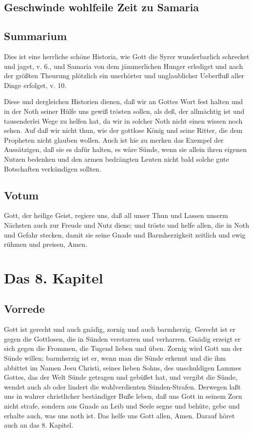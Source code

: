 \section{Geschwinde wohlfeile Zeit zu Samaria}

\section{Summarium}

Dies ist eine herrliche schöne Historia, wie Gott die Syrer wunderbarlich schrecket und jaget, v. 6., und Samaria von dem jämmerlichen Hunger erlediget und nach der größten Theurung plötzlich ein unerhörter und unglaublicher Ueberfluß aller Dinge erfolget, v. 10.

Diese und dergleichen Historien dienen, daß wir an Gottes Wort fest halten und in der Noth seiner Hülfe uns gewiß trösten sollen, als deß,
der allmächtig ist und tausenderlei Wege zu helfen hat, da wir in solcher Noth nicht einen wissen noch sehen. Auf daß wir nicht thun, wie der gottlose König und seine Ritter, die dem Propheten nicht glauben wollen. Auch ist hie zu merken das Exempel der Aussätzigen, daß sie es dafür halten, es wäre Sünde, wenn sie allein ihren eigenen Nutzen bedenken und den armen bedrängten Leuten nicht bald solche gute Botschaften verkündigen sollten.

\section{Votum}

Gott, der heilige Geist, regiere uns, daß all unser Thun und Lassen unserm Nächsten auch zur Freude und Nutz diene; und tröste und helfe allen, die in Noth und Gefahr stecken, damit sie seine Gnade und Barmherzigkeit zeitlich und ewig rühmen und preisen, Amen.

\chapter{Das 8. Kapitel}

\section{Vorrede}

Gott ist gerecht und auch gnädig, zornig und auch barmherzig. Gerecht ist er gegen die Gottlosen, die in Sünden verstarren und verharren. Gnädig erzeigt er sich gegen die Frommen, die Tugend lieben und üben. Zornig wird Gott um der Sünde willen; barmherzig ist er, wenn man die Sünde erkennt und die ihm abbittet im Namen Jesu Christi, seines lieben Sohns, des unschuldigen Lammes Gottes, das der Welt Sünde getragen und gebüßet hat, und vergibt die Sünde, wendet auch ab oder lindert die wohlverdienten Sünden-Strafen. Derwegen laßt uns in wahrer christlicher beständiger Buße leben, daß uns Gott in seinem Zorn nicht strafe, sondern aus Gnade an Leib und Seele segne und behüte, gebe und erhalte auch, was uns noth ist. Das helfe uns Gott allen, Amen. Darauf höret auch an das 8. Kapitel.

